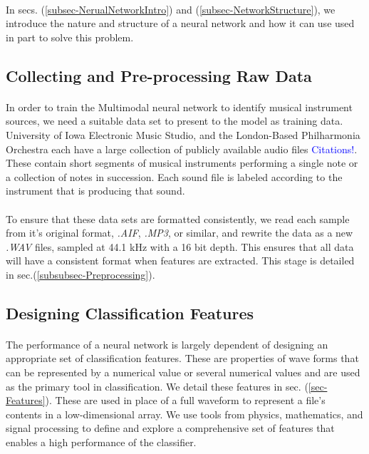 \documentclass[12pt,letterpaper]{article}
\begin{document}
\paragraph*{}In secs. (\ref{subsec-NerualNetworkIntro}) and (\ref{subsec-NetworkStructure}), we introduce the nature and structure of a neural network and how it can use used in part to solve this problem.


\subsection{Collecting and Pre-processing Raw Data}

\paragraph*{}In order to train the Multimodal neural network to identify musical instrument sources, we need a suitable data set to present to the model as training data. University of Iowa Electronic Music Studio, and the London-Based Philharmonia Orchestra each have a large collection of publicly available audio files \textcolor{blue}{Citations!}. These contain short segments of musical instruments performing a single note or a collection of notes in succession. Each sound file is labeled according to the instrument that is producing that sound.

\paragraph*{}To ensure that these data sets are formatted consistently, we read each sample from it's original format, \textit{.AIF}, \textit{.MP3}, or similar, and rewrite the data as a new \textit{.WAV} files, sampled at 44.1 kHz with a 16 bit depth. This ensures that all data will have a consistent format when features are extracted. This stage is detailed in sec.(\ref{subsubsec-Preprocessing}).


\subsection{Designing Classification Features}

\paragraph*{}The performance of a neural network is largely dependent of designing an appropriate set of classification features. These are properties of wave forms that can be represented by a numerical value or several numerical values and are used as the primary tool in classification. We detail these features in sec. (\ref{sec-Features}). These are used in place of a full waveform to represent a file's contents in a low-dimensional array. We use tools from physics, mathematics, and signal processing to define and explore a comprehensive set of features that enables a high performance of the classifier. 
\end{document}
